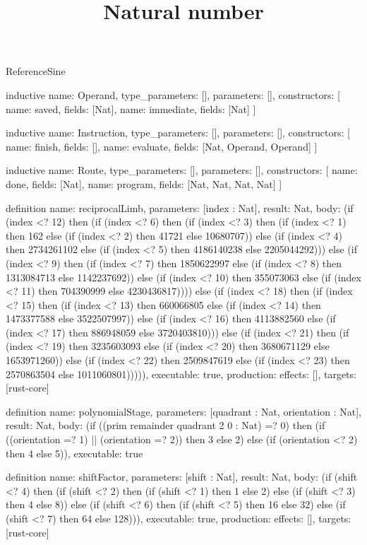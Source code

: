 \begin{lexlean}{ReferenceSine}
\title{Natural number}
\begin{semanticmodule}
inductive{
  name: Operand,
  type_parameters: [],
  parameters: [],
  constructors: [
    {name: saved, fields: [Nat]},
    {name: immediate, fields: [Nat]}
  ]
}

inductive{
  name: Instruction,
  type_parameters: [],
  parameters: [],
  constructors: [
    {name: finish, fields: []},
    {name: evaluate, fields: [Nat, Operand, Operand]}
  ]
}

inductive{
  name: Route,
  type_parameters: [],
  parameters: [],
  constructors: [
    {name: done, fields: [Nat]},
    {name: program, fields: [Nat, Nat, Nat, Nat]}
  ]
}

definition{
  name: reciprocalLimb,
  parameters: [index : Nat],
  result: Nat,
  body: (if (index <? 12) then (if (index <? 6) then (if (index <? 3) then (if (index <? 1) then 162 else (if (index <? 2) then 41721 else 10680707)) else (if (index <? 4) then 2734261102 else (if (index <? 5) then 4186140238 else 2205044292))) else (if (index <? 9) then (if (index <? 7) then 1850622997 else (if (index <? 8) then 1313084713 else 1142237692)) else (if (index <? 10) then 355073063 else (if (index <? 11) then 704390999 else 4230436817)))) else (if (index <? 18) then (if (index <? 15) then (if (index <? 13) then 660066805 else (if (index <? 14) then 1473377588 else 3522507997)) else (if (index <? 16) then 4113882560 else (if (index <? 17) then 886948059 else 3720403810))) else (if (index <? 21) then (if (index <? 19) then 3235603093 else (if (index <? 20) then 3680671129 else 1653971260)) else (if (index <? 22) then 2509847619 else (if (index <? 23) then 2570863504 else 1011060801))))),
  executable: true,
  production: {effects: [], targets: [rust-core]}
}

definition{
  name: polynomialStage,
  parameters: [quadrant : Nat, orientation : Nat],
  result: Nat,
  body: (if ((prim remainder quadrant 2 0 : Nat) =? 0) then (if ((orientation =? 1) || (orientation =? 2)) then 3 else 2) else (if (orientation <? 2) then 4 else 5)),
  executable: true
}

definition{
  name: shiftFactor,
  parameters: [shift : Nat],
  result: Nat,
  body: (if (shift <? 4) then (if (shift <? 2) then (if (shift <? 1) then 1 else 2) else (if (shift <? 3) then 4 else 8)) else (if (shift <? 6) then (if (shift <? 5) then 16 else 32) else (if (shift <? 7) then 64 else 128))),
  executable: true,
  production: {effects: [], targets: [rust-core]}
}


\end{semanticmodule}
\end{lexlean}
